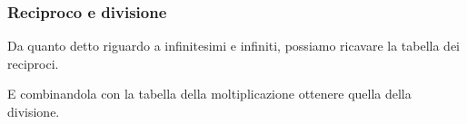 \begin{multicols}{2}
\end{multicols}

\subsubsection{Reciproco e divisione}
\label{subsec:insnum_reciproco}

\begin{multicols}{2}
Da quanto detto riguardo a infinitesimi e infiniti, 
possiamo ricavare la tabella dei reciproci.

\begin{center} \scalebox{0.8}{\tabrec} \end{center}

E combinandola con la tabella della moltiplicazione ottenere quella della 
divisione.
\begin{center} \scalebox{0.8}{\tabdiv} \end{center}

\end{multicols}

